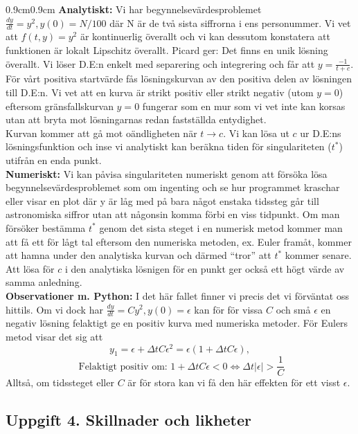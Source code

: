 \documentclass{article}
\begin{document}
\begin{adjustwidth}{0.9cm}{0.9cm}
\textbf{Analytiskt:} Vi har begynnelsevärdesproblemet $\frac{dy}{dt}=y^2,y(0)=N/100$ där N är de två sista siffrorna i ens personummer. Vi vet att $f(t,y)=y^2$ är kontinuerlig överallt och vi kan dessutom konstatera att funktionen är lokalt Lipschitz överallt. Picard ger: Det finns en unik lösning överallt. Vi löser D.E:n enkelt med separering och integrering och får att $y=\frac{-1}{t+c}$. För vårt positiva startvärde fås lösningskurvan av den positiva delen av lösningen till D.E:n. Vi vet att en kurva är strikt positiv eller strikt negativ (utom $y=0$) eftersom gränsfallskurvan $y=0$ fungerar som en mur som vi vet inte kan korsas utan att bryta mot lösningarnas redan fastställda entydighet.
\medskip\\
Kurvan kommer att gå mot oändligheten när $t\to c$. Vi kan lösa ut $c$ ur D.E:ns lösningsfunktion och inse vi analytiskt kan beräkna tiden för singulariteten ($t^*$) utifrån en enda punkt. 
\medskip\\
\textbf{Numeriskt:} Vi kan påvisa singulariteten numeriskt genom att försöka lösa begynnelsevärdesproblemet som om ingenting och se hur programmet kraschar eller visar en plot där y är låg med på bara något enstaka tidssteg går till astronomiska siffror utan att någonsin komma förbi en viss tidpunkt. Om man försöker bestämma $t^*$ genom det sista steget i en numerisk metod kommer man att få ett för lågt tal eftersom den numeriska metoden, ex. Euler framåt, kommer att hamna under den analytiska kurvan och därmed ``tror'' att $t^*$ kommer senare. Att lösa för $c$ i den analytiska lösnigen för en punkt ger också ett högt värde av samma anledning.
\medskip\\
\textbf{Observationer m. Python:} I det här fallet finner vi precis det vi förväntat oss hittils. Om vi dock har $\frac{dy}{dt}=Cy^2,y(0)=\epsilon$ kan för för vissa $C$ och små $\epsilon$ en negativ lösning felaktigt ge en positiv kurva med numeriska metoder. För Eulers metod visar det sig att
\[
y_{1}=\epsilon + \Delta tC\epsilon^2 = \epsilon(1+\Delta tC\epsilon), 
\]
\[
\text{ Felaktigt positiv om: }1+\Delta tC\epsilon<0\Leftrightarrow \Delta t|\epsilon| > \frac{1}{C}
\]
Alltså, om tidssteget eller $C$ är för stora kan vi få den här effekten för ett visst $\epsilon$. 
\end{adjustwidth}


\subsection*{Uppgift 4. Skillnader och likheter}
\end{document}
